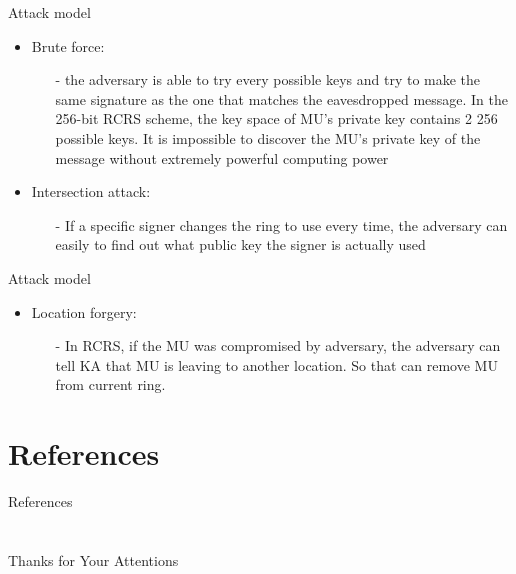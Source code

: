 \documentclass{beamer}
\begin{document}
\begin{frame}{Attack model}
    \begin{itemize}
        \item {Brute force:}
        \begin{itemize}
            \item[-] the adversary is able to try every possible keys and try to make the same signature as the one that matches the eavesdropped message. In the 256-bit RCRS scheme, the key space of MU’s private key contains 2 256 possible keys. It is impossible to discover the MU’s private key of the message without extremely powerful computing power
        \end{itemize}
        \item {Intersection attack:}
        \begin{itemize}
            \item[-] If a specific signer changes the ring to use every time, the adversary can easily to find out what public key the signer is actually used
        \end{itemize}
    \end{itemize}
\end{frame}
\begin{frame}{Attack model}
    \begin{itemize}
        \item {Location forgery:}
        \begin{itemize}
            \item[-] In RCRS, if the MU was compromised by adversary, the adversary can tell KA that MU is leaving to another location. So that can remove MU from current ring.
        \end{itemize}
    \end{itemize}
\end{frame}


\section{References}
\calcreferencespagetotal %
\begin{frame}[allowframebreaks]{References}
    \fontsize{9pt}{13}\selectfont
    
    
\end{frame}

\section{}

\begin{frame}
    \centering
    \Large{Thanks for Your Attentions}
\end{frame}
\end{document}
